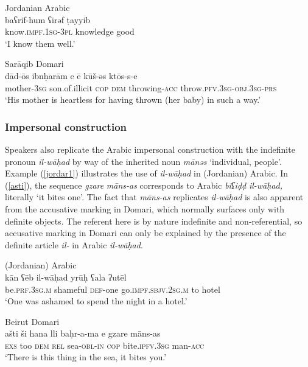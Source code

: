 \documentclass[output=paper]{langsci/langscibook}
\begin{document}
\ea
{Jordanian Arabic}\\ \label{jordar}
\gll baʕrif-hum ʕirəf ṭayyib\\
     know.\textsc{impf.1sg-3pl} knowledge good\\
\glt ‘I know them well.’
\z

\ea\label{ex:key:} \label{dados}
{Sarāqib Domari}\\
\gll dād-ōs ibnḥarām e ē kūš-əs ktōs-s-e\\
     mother-\textsc{3sg} son.of.illicit \textsc{cop} \textsc{dem} throwing-\textsc{acc} throw.\textsc{pfv.3sg-obj.3sg-prs}\\
\glt ‘His mother is heartless for having thrown (her baby) in such a way.’
\z


 \subsubsection{Impersonal construction}

Speakers also replicate the Arabic impersonal construction with the indefinite pronoun \textit{il-wāḥad} by way of the inherited noun \textit{mānəs} ‘individual, people’. Example (\ref{jordar1}) illustrates the use of \textit{il-wāḥad} in (Jordanian) Arabic. In (\ref{asti}), the sequence \textit{gzare} \textit{māns-as} corresponds to Arabic \textit{biʕiḍḍ} \textit{il-wāḥad,} literally ‘it bites one’. The fact that \textit{māns-as} replicates \textit{il-wāḥad} is also apparent from the accusative marking in Domari, which normally surfaces only with definite objects. The referent here is by nature indefinite and non-referential, so accusative marking in Domari can only be explained by the presence of the definite article \textit{il-} in Arabic \textit{il-wāḥad}.

\ea
{(Jordanian) Arabic}\\ \label{jordar1}
\gll kān ʕēb il-wāḥad yrūḥ ʕala ʔutēl\\
     be.\textsc{prf.3sg.m} shameful \textsc{def-}one go.\textsc{impf.sbjv.2sg.m} to hotel\\
\glt ‘One was ashamed to spend the night in a hotel.’
\z

\ea\label{ex:key:} \label{asti}
{Beirut Domari}\\
\gll ašti ši hana lli baḥr-a-ma e gzare māns-as\\
     \textsc{exs} too \textsc{dem} \textsc{rel} sea-\textsc{obl-in} \textsc{cop} bite.\textsc{ipfv.3sg} man-\textsc{acc}\\
\glt ‘There is this thing in the sea, it bites you.’
\z
\end{document}
